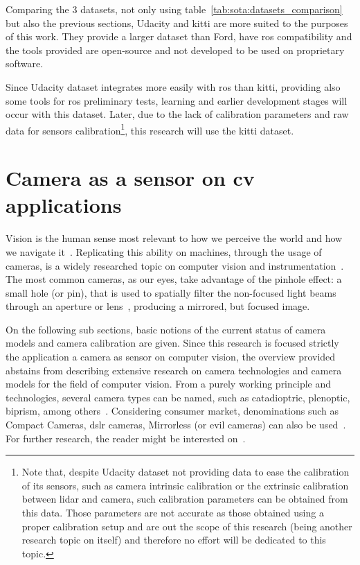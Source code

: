Comparing the 3 datasets, not only using table~\ref{tab:sota:datasets_comparison} but also the previous sections, Udacity and \ac{kitti} are more suited to the purposes of this work. They provide a larger dataset than Ford, have \ac{ros} compatibility and the tools provided are open-source and not developed to be used on proprietary software.

Since Udacity dataset integrates more easily with \ac{ros} than \ac{kitti}, providing also some tools for \ac{ros} preliminary tests, learning and earlier development stages will occur with this dataset. Later, due to the lack of calibration parameters and raw data for sensors calibration\footnote{Note that, despite Udacity dataset not providing data to ease the calibration of its sensors, such as camera intrinsic calibration or the extrinsic calibration between \ac{lidar} and camera, such calibration parameters can be obtained from this data. Those parameters are not accurate as those obtained using a proper calibration setup and are out the scope of this research (being another research topic on itself) and therefore no effort will be dedicated to this topic.}, this research will use the \ac{kitti} dataset.



\section{Camera as a sensor on \acl{cv} applications}
Vision is the human sense most relevant to how we perceive the world and how we navigate it~\cite{Ekstrom2015, Beck1983}. Replicating this ability on machines, through the usage of cameras, is a widely researched topic on computer vision and instrumentation~\cite{Beck1983}. The most common cameras, as our eyes, take advantage of the pinhole effect: a small hole (or pin), that is used to spatially filter the non-focused light beams through an aperture or lens~\cite{Beck1983, camera_models, Sturm2010}, producing a mirrored, but focused image.

On the following sub sections, basic notions of the current status of camera models and camera calibration are given. Since this research is focused strictly the application a camera as sensor on computer vision, the overview provided abstains from describing extensive research on camera technologies and camera models for the field of computer vision. From a purely working principle and technologies, several camera types can be named, such as catadioptric, plenoptic, biprism, among others~\cite{Sturm2010}. Considering consumer market, denominations such as Compact Cameras, \ac{dslr} cameras, Mirrorless (or \ac{evil} cameras) can also be used~\cite{comercial_cameras}. For further research, the reader might be interested on~\cite{comercial_cameras, Sturm2010, camera_models, Merklinger1993, Photopillers}.


